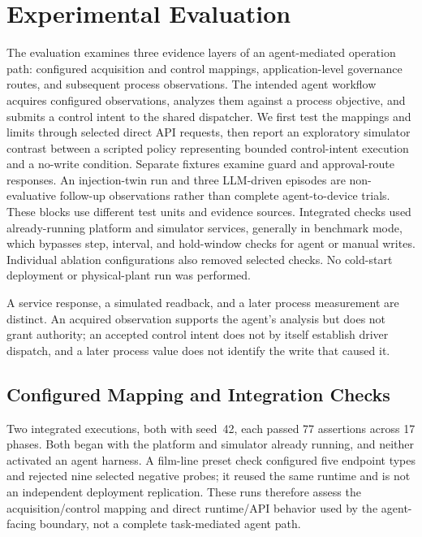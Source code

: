 \section{Experimental Evaluation}
\label{sec:eval}
The evaluation examines three evidence layers of an agent-mediated operation path: configured acquisition and control mappings, application-level governance routes, and subsequent process observations. The intended agent workflow acquires configured observations, analyzes them against a process objective, and submits a control intent to the shared dispatcher. We first test the mappings and limits through selected direct API requests, then report an exploratory simulator contrast between a scripted policy representing bounded control-intent execution and a no-write condition. Separate fixtures examine guard and approval-route responses. An injection-twin run and three LLM-driven episodes are non-evaluative follow-up observations rather than complete agent-to-device trials. These blocks use different test units and evidence sources. Integrated checks used already-running platform and simulator services, generally in benchmark mode, which bypasses step, interval, and hold-window checks for agent or manual writes. Individual ablation configurations also removed selected checks. No cold-start deployment or physical-plant run was performed.

A service response, a simulated readback, and a later process measurement are distinct. An acquired observation supports the agent's analysis but does not grant authority; an accepted control intent does not by itself establish driver dispatch, and a later process value does not identify the write that caused it.

\subsection{Configured Mapping and Integration Checks}
\label{sec:eval-mapping}
Two integrated executions, both with seed~42, each passed 77 assertions across 17 phases. Both began with the platform and simulator already running, and neither activated an agent harness. A film-line preset check configured five endpoint types and rejected nine selected negative probes; it reused the same runtime and is not an independent deployment replication. These runs therefore assess the acquisition/control mapping and direct runtime/API behavior used by the agent-facing boundary, not a complete task-mediated agent path.

